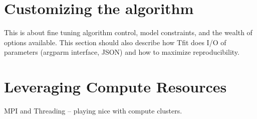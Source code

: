 \documentclass[11pt]{article}
\begin{document}
\section{Customizing the algorithm}
This is about fine tuning algorithm control, model constraints, and 
the wealth of options available.   This section should also describe 
how Tfit does I/O of parameters (argparm interface, JSON) and how
to maximize reproducibility. 

\section{Leveraging Compute Resources}
MPI and Threading -- playing nice with compute clusters.

\small{
  
  {}
}
\end{document}
